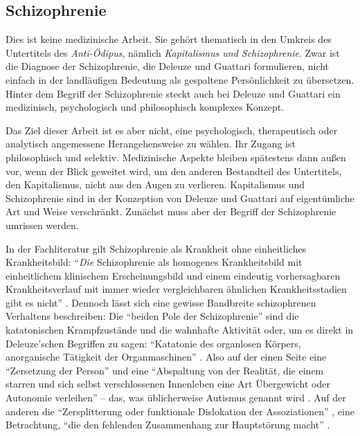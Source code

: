 \documentclass[12pt,
               DIV13,
               paper=a4,
               twoside=false,
               onehalfspacing,
               bibliography=totoc,
               toc=graduated,
               draft,
               ]{scrartcl}
\newcommand{\pc}[2]{\parencite[#1]{#2}}
\newcommand{\vgl}[2]{\parencite[vgl.][#1]{#2}}
\newcommand{\worries}[1]{\ifdraft{\textcolor{blue}{\texttt{(#1)}}}{}}
\newcommand{\dg}{Deleuze und Guattari\xspace}
\begin{document}

\subsection{Schizophrenie}


Dies ist keine medizinische Arbeit. Sie gehört thematisch in den
Umkreis des Untertitels des \emph{Anti-Ödipus}, nämlich
\emph{Kapitalismus und Schizophrenie}. Zwar ist die Diagnose der
Schizophrenie, die Deleuze und Guattari formulieren, nicht einfach in
der landläufigen Bedeutung als \glq gespaltene Persönlichkeit\grq{} zu
übersetzen. Hinter dem Begriff der Schizophrenie steckt auch bei
Deleuze und Guattari ein medizinisch, psychologisch und philosophisch
komplexes Konzept.

Das Ziel dieser Arbeit ist es aber nicht, eine psychologisch,
therapeutisch oder analytisch angemessene Herangehensweise zu wählen.
Ihr Zugang ist philosophisch und selektiv. Medizinische Aspekte
bleiben spätestens dann außen vor, wenn der Blick geweitet wird, um
den anderen Bestandteil des Untertitels, den Kapitalismus, nicht aus
den Augen zu verlieren. Kapitalismus und Schizophrenie sind in der
Konzeption von \dg auf eigentümliche Art und Weise verschränkt.
Zunächst muss aber der Begriff der Schizophrenie umrissen werden.

In der Fachliteratur gilt Schizophrenie als Krankheit ohne
einheitliches Krankheitsbild: "`\emph{Die} Schizophrenie als homogenes
Krankheitsbild mit einheitlichem klinischem Erscheinungsbild und einem
eindeutig vorhersagbaren Krankheitsverlauf mit immer wieder
vergleichbaren ähnlichen Krankheitsstadien gibt es nicht"' \pc{S. 799,
Hervorh. im Orig.}{psych}. Dennoch lässt sich eine gewisse Bandbreite
schizophrenen Verhaltens beschreiben: Die "`beiden Pole der
Schizophrenie"' \pc{21}{schizg} sind die katatonischen Krampfzustände
und die wahnhafte Aktivität oder, um es direkt in Deleuze'schen
Begriffen zu sagen: "`Katatonie des organlosen Körpers, anorganische
Tätigkeit der Organmaschinen"' \pc{21}{schizg}. Also auf der einen
Seite eine "`Zersetzung der Person"' und eine "`Abspaltung von der
Realität, die einem starren und sich selbst verschlossenen Innenleben
eine Art Übergewicht oder Autonomie verleihen"' \pc{23}{schizg} --
das, was üblicherweise Autismus genannt wird \vgl{801}{psych}. Auf der
anderen die "`Zersplitterung oder funktionale Dislokation der
Assoziationen"' \pc{23}{schizg}, eine Betrachtung, "`die den fehlenden
Zusammenhang zur Hauptstörung macht"' \pc{23}{schizg}.
\end{document}
